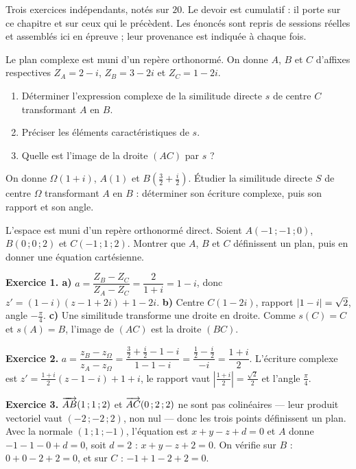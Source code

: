 \begin{devoir}[2 heures]
Trois exercices indépendants, notés sur $20$. Le devoir est cumulatif : il porte sur ce chapitre et sur ceux qui le précèdent. Les énoncés sont repris de sessions réelles et assemblés ici en épreuve ; leur provenance est indiquée à chaque fois.

Le plan complexe est muni d'un repère orthonormé. On donne $A$, $B$ et $C$
d'affixes respectives $Z_{A} = 2-i$, $Z_{B} = 3-2i$ et $Z_{C} = 1-2i$.
\begin{enumerate}[label=\textbf{\alph*)}, leftmargin=*, itemsep=0.15em]
  \item Déterminer l'expression complexe de la similitude directe $s$ de
        centre $C$ transformant $A$ en $B$.
  \item Préciser les éléments caractéristiques de $s$.
  \item Quelle est l'image de la droite $(AC)$ par $s$ ?
\end{enumerate}

On donne $\Omega(1+i)$, $A(1)$ et $B\!\left(\frac32+\frac i2\right)$. Étudier
la similitude directe $S$ de centre $\Omega$ transformant $A$ en $B$ :
déterminer son écriture complexe, puis son rapport et son angle.

L'espace est muni d'un repère orthonormé direct. Soient $A(-1\,;-1\,;0)$,
$B(0\,;0\,;2)$ et $C(-1\,;1\,;2)$. Montrer que $A$, $B$ et $C$ définissent un
plan, puis en donner une équation cartésienne.

\end{devoir}

\begin{corrige}
\textbf{Exercice 1. a)} $a = \dfrac{Z_{B}-Z_{C}}{Z_{A}-Z_{C}} = \dfrac{2}{1+i} = 1-i$,
donc $z' = (1-i)(z-1+2i)+1-2i$.
\textbf{b)} Centre $C(1-2i)$, rapport $\left|1-i\right| = \sqrt2$, angle
$-\frac{\pi}{4}$.
\textbf{c)} Une similitude transforme une droite en droite. Comme
$s(C) = C$ et $s(A) = B$, l'image de $(AC)$ est la droite $(BC)$.

\textbf{Exercice 2.} $a = \dfrac{z_{B}-z_{\Omega}}{z_{A}-z_{\Omega}}
= \dfrac{\frac32+\frac i2-1-i}{1-1-i}
= \dfrac{\frac12-\frac i2}{-i} = \dfrac{1+i}{2}$. L'écriture complexe est
$z' = \frac{1+i}{2}\left(z-1-i\right)+1+i$, le rapport vaut
$\left|\frac{1+i}{2}\right| = \frac{\sqrt2}{2}$ et l'angle
$\frac{\pi}{4}$.

\textbf{Exercice 3.} $\overrightarrow{AB}(1\,;1\,;2)$ et $\overrightarrow{AC}(0\,;2\,;2)$ ne sont pas
colinéaires — leur produit vectoriel vaut $(-2\,;-2\,;2)$, non nul — donc les
trois points définissent un plan. Avec la normale $(1\,;1\,;-1)$, l'équation
est $x+y-z+d = 0$ et $A$ donne $-1-1-0+d = 0$, soit $d = 2$ :
$x+y-z+2 = 0$. On vérifie sur $B$ : $0+0-2+2 = 0$, et sur $C$ :
$-1+1-2+2 = 0$.

\end{corrige}
